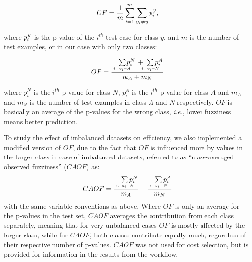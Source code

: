 \documentclass[utf8]{frontiersSCNS} %
\begin{document}
\begin{equation}
OF =\frac{ 1}{m} \sum\limits_{i=1}^{m} \sum\limits_{y_i \neq y }  p_i^{\kern1pt y},		
\end{equation}

where $p_i^{\kern1pt y}$ is the p-value of the $i^{th}$ test case for class $y$, and $m$ is the number of test examples, or in our case with only two classes:

\begin{equation}
OF =  \frac
        {\quad\sum\limits_{\mathclap{\substack{\scriptscriptstyle i,\ y_i=A}}}p_i^N \, + \;\sum\limits_{\mathclap{\substack{\scriptscriptstyle i,\ y_i=N}}}p_i^A}
        {m_A + m_N}
\end{equation}

where $p_i^N$ is the $i^{th}$ p-value for class $N$, $p_i^A$ is the $i^{th}$
p-value for class $A$ and $m_A$ and $m_N$ is the number of test examples in
class $A$ and $N$ respectively. $OF$ is basically an average of the p-values for
the wrong class, \textit{i.e.}, lower fuzziness means better prediction.

To study the effect of imbalanced datasets on efficiency, we also implemented a
modified version of $OF$, due to the fact that $OF$ is influenced more
by values in the larger class in case of imbalanced datasets, referred to as
``class-averaged
observed fuzziness'' ($CAOF$) as:
\begin{equation}
CAOF = \frac
        {\quad\sum\limits_{\mathclap{\substack{\scriptscriptstyle i,\ y_i=A}}}p_i^N}
        {m_A}
       + \frac
        {\quad\sum\limits_{\mathclap{\substack{\scriptscriptstyle i,\ y_i=N}}}p_i^A}
        {m_N}
\end{equation}
with the same variable conventions as above. Where $OF$ is only an average for
the p-values in the test set, $CAOF$ averages the contribution from each class
separately, meaning that for very unbalanced cases $OF$ is mostly affected by
the larger class, while for $CAOF$, both classes contribute equally much,
regardless of their respective number of p-values.
%
%
%
$CAOF$ was not used for cost selection, but is provided for information in the
results from the workflow.
\end{document}
